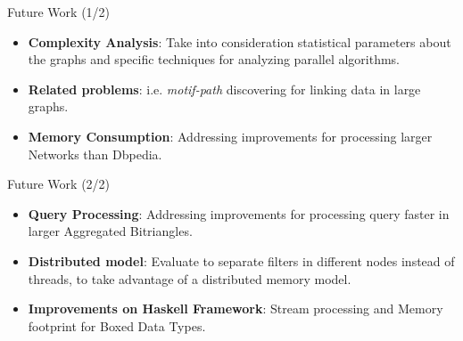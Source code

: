 \begin{frame}[fragile]{Future Work (1/2)}
    \begin{itemize}
      \setlength\itemsep{1.5em}
      \item \textbf{Complexity Analysis}: Take into consideration statistical parameters about the graphs and specific techniques for analyzing parallel algorithms.
      \item \textbf{Related problems}: i.e. \emph{motif-path} discovering for linking data in large graphs.
      \item \textbf{Memory Consumption}: Addressing improvements for processing larger Networks than Dbpedia.
    \end{itemize}
\end{frame}

\begin{frame}[fragile]{Future Work (2/2)}
  \begin{itemize}
    \setlength\itemsep{1.5em}
    \item \textbf{Query Processing}: Addressing improvements for processing query faster in larger Aggregated Bitriangles.
    \item \textbf{Distributed model}: Evaluate to separate filters in different nodes instead of threads, to take advantage of a distributed memory model.
    \item \textbf{Improvements on Haskell Framework}: Stream processing and Memory footprint for Boxed Data Types.
  \end{itemize}
\end{frame}

